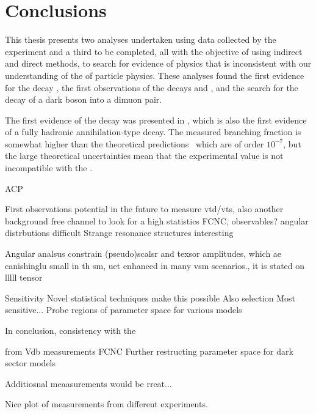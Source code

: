 \chapter{Conclusions}
\label{ch:conc}


This thesis presents two analyses undertaken using data collected by the \lhcb experiment
and a third to be completed, all
with the objective of using indirect and direct methods, to search for evidence of physics that is
inconsistent with our understanding of the \sm of particle physics.
These analyses found the first evidence for the decay \btodsphi, the first observations of the
decays \btokpipimumu and \btophikmumu, and the search for the decay of a dark boson into a dimuon
pair.

The first evidence of the decay \btodsphi was presented in , which is also the
first evidence of a fully hadronic annihilation-type decay.
The measured branching fraction is somewhat higher than the theoretical
predictions~\cite{Zou:2009zza,Mohanta:2002wf,PhysRevD.76.057701,Lu:2001yz} which are of
order $10^{-7}$, but the large theoretical uncertainties mean that the experimental value is
not incompatible with the \sm.

ACP





\btokpipimumu \btophikmumu
First observations
potential in the future to measure vtd/vts, also another background free channel to look for a \db
high statistics
FCNC, observables?
angular distrbutions difficult
Strange resonance structures interesting

Angular analsus constrain (pseudo)scalsr and texsor amplitudes, which ae canishinglu small in th
sm, uet enhanced in many vsm scenarios., it is stated on lllll tensor


\btokstrdb
Sensitivity
Novel statistical techniques make this possible
Also selection
Most sensitive...
Probe regions of parameter space for various models



In conclusion,
consistency with the \sm

from Vdb measurements
FCNC
Further restructing parameter space for dark sector models

Additiosnal meaasurements would be rreat...


Nice plot of measurements from different experiments.








